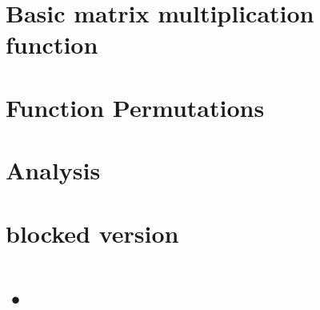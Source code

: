 \documentclass[12pt, twoside,a4paper]{report}
\begin{document}
\chapter{Basic matrix multiplication function}


\chapter{Function Permutations}

\chapter{Analysis}


\chapter{blocked version}

\chapter{•}

%


\end{document}
